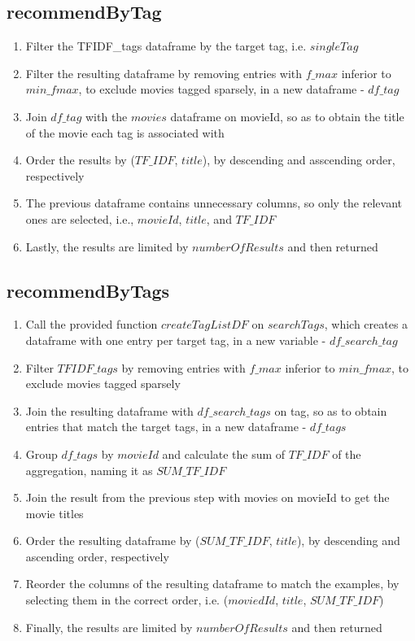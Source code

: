 \documentclass[10pt,twocolumn]{article}
\begin{document}
\subsection{recommendByTag}
\begin{enumerate}
    \itemsep0em
    \item Filter the TFIDF\_tags dataframe by the target tag, i.e. $singleTag$
    \item Filter the resulting dataframe by removing entries with $f\_max$ inferior to $min\_fmax$, to exclude movies tagged sparsely, in a new dataframe - $df\_tag$
    \item Join $df\_tag$ with the $movies$ dataframe on movieId, so as to obtain the title of the movie each tag is associated with
    \item Order the results by ($TF\_IDF$, $title$), by descending and asscending order, respectively
    \item The previous dataframe contains unnecessary columns, so only the relevant ones are selected, i.e., $movieId$, $title$, and $TF\_IDF$
    \item Lastly, the results are limited by $numberOfResults$ and then returned
\end{enumerate}

\subsection{recommendByTags}\label{sec:recommendByTags}
\begin{enumerate}
    \itemsep0em
    \item Call the provided function $createTagListDF$ on $searchTags$, which creates a dataframe with one entry per target tag, in a new variable - $df\_search\_tag$
    \item Filter $TFIDF\_tags$ by removing entries with $f\_max$ inferior to $min\_fmax$, to exclude movies tagged sparsely
    \item Join the resulting dataframe with $df\_search\_tags$ on tag, so as to obtain entries that match the target tags, in a new dataframe - $df\_tags$
    \item Group $df\_tags$ by $movieId$ and calculate the sum of $TF\_IDF$ of the aggregation, naming it as $SUM\_TF\_IDF$
    \item Join the result from the previous step with movies on movieId to get the movie titles
    \item Order the resulting dataframe by ($SUM\_TF\_IDF$, $title$), by descending and ascending order, respectively
    \item Reorder the columns of the resulting dataframe to match the examples, by selecting them in the correct order, i.e. ($moviedId$, $title$, $SUM\_TF\_IDF$)
    \item Finally, the results are limited by $numberOfResults$ and then returned 
\end{enumerate}
\end{document}
